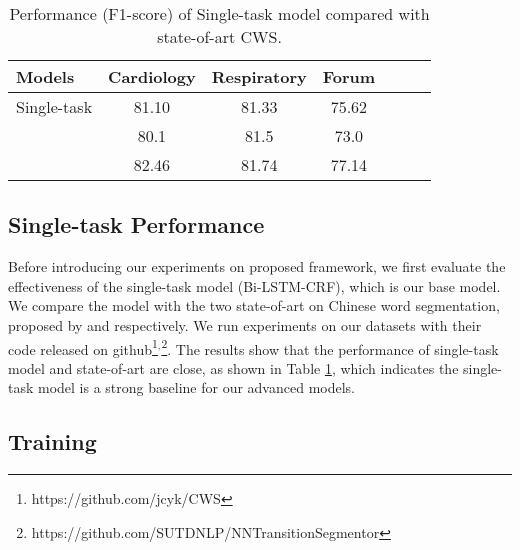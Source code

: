 \begin{table}[t!]
\small
\centering
\caption{Performance (F1-score) of Single-task model compared with state-of-art CWS.}\label{table:single-robust}
\begin{adjustbox}{width=7.7cm}
\begin{tabular}{lcccccc}
\hline
Models & Cardiology & Respiratory & Forum\\
\hline
Single-task & 81.10 & 81.33 & 75.62\\
~\cite{DBLP:journals/corr/CaiZ16} & 80.1 & 81.5 & 73.0\\
~\cite{DBLP:conf/acl/ZhangZF16} & 82.46 & 81.74 & 77.14 \\
\hline
\end{tabular}
\end{adjustbox}
\end{table}

\subsection{Single-task Performance}\label{sec:single-robust}

Before introducing our experiments on proposed framework, we first evaluate the effectiveness of the single-task model (Bi-LSTM-CRF), which is our base model. 
We compare the model with the two state-of-art on Chinese word segmentation, proposed by  and  respectively. We run experiments on our datasets with their code released on github\footnote{https://github.com/jcyk/CWS}$^{,}$\footnote{https://github.com/SUTDNLP/NNTransitionSegmentor}. The results show that the performance of single-task model and state-of-art are close, as shown in Table \ref{table:single-robust}, which indicates the single-task model is a strong baseline for our advanced models. 

\subsection{Training}

